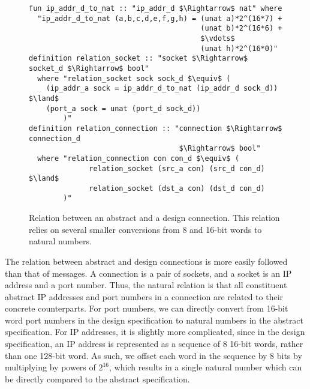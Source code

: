 \documentclass[twoside]{memoir}
\begin{document}
\begin{figure}[h]
    \centering
    \begin{lstlisting}[language=isabelle]
fun ip_addr_d_to_nat :: "ip_addr_d $\Rightarrow$ nat" where
  "ip_addr_d_to_nat (a,b,c,d,e,f,g,h) = (unat a)*2^(16*7) +
                                        (unat b)*2^(16*6) +
                                        $\vdots$
                                        (unat h)*2^(16*0)"
definition relation_socket :: "socket $\Rightarrow$ socket_d $\Rightarrow$ bool"
  where "relation_socket sock sock_d $\equiv$ (
    (ip_addr_a sock = ip_addr_d_to_nat (ip_addr_d sock_d)) $\land$
    (port_a sock = unat (port_d sock_d))
        )"
definition relation_connection :: "connection $\Rightarrow$ connection_d
                                   $\Rightarrow$ bool"
  where "relation_connection con con_d $\equiv$ (
              relation_socket (src_a con) (src_d con_d) $\land$
              relation_socket (dst_a con) (dst_d con_d)
        )"
    \end{lstlisting}
    \caption{Relation between an abstract and a design connection.
    This relation relies on several smaller conversions from 8 and 16-bit words to natural numbers.
    }
    \label{fig:rel-conn}
\end{figure}

The relation between abstract and design connections is more easily followed than that of messages.
A connection is a pair of sockets, and a socket is an IP address and a port number.
Thus, the natural relation is that all constituent abstract IP addresses and port numbers in a connection
are related to their concrete counterparts.
For port numbers, we can directly convert from 16-bit word port numbers in the design specification
to natural numbers in the abstract specification.
For IP addresses, it is slightly more complicated, since in the design specification,
an IP address is represented as a sequence of 8 16-bit words, rather than one 128-bit word.
As such, we offset each word in the sequence by 8 bits by multiplying by powers of $2^16$,
which results in a single natural number which can be directly compared to the abstract specification.
\end{document}

